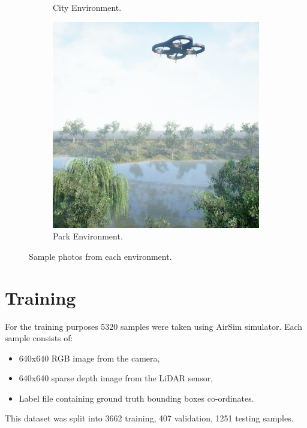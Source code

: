 \documentclass[twoside]{ctuthesis}
\theoremstyle{plain}
\theoremstyle{definition}
\theoremstyle{note}
\begin{document}
\begin{figure}
\begin{subfigure}[b]{0.3\textwidth}
		\caption{City Environment.}
	\end{subfigure}
	\hfill
	\begin{subfigure}[b]{0.3\textwidth}
		\centering
		\includegraphics[width=\textwidth]{park_rgb.png}
		\caption{Park Environment.}
	\end{subfigure}
	\caption{Sample photos from each environment.}
\end{figure}
\section{Training}
For the training purposes 5320 samples were taken using AirSim simulator. Each sample consists of:
\begin{itemize}
	\item 640x640 RGB image from the camera,
	\item 640x640 sparse depth image from the LiDAR sensor,
	\item Label file containing ground truth bounding boxes co-ordinates.
\end{itemize}
This dataset was split into 3662 training, 407 validation, 1251 testing samples.
\end{document}
